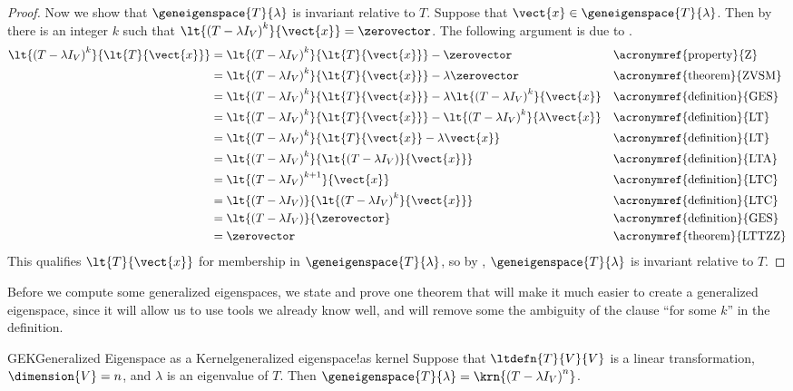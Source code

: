 \begin{proof}
%
Now we show that $\geneigenspace{T}{\lambda}$ is invariant relative to $T$.  Suppose that $\vect{x}\in\geneigenspace{T}{\lambda}$.  Then by  there is an integer $k$ such that $\lt{\left(T-\lambda I_V\right)^k}{\vect{x}}=\zerovector$.  The following argument is due to \zoltantoth.
%
\begin{align*}
\lt{\left(T-\lambda I_V\right)^k}{\lt{T}{\vect{x}}}
%
&=\lt{\left(T-\lambda I_V\right)^k}{\lt{T}{\vect{x}}} - \zerovector
&&\text{\acronymref{property}{Z}}\\
%
&=\lt{\left(T-\lambda I_V\right)^k}{\lt{T}{\vect{x}}} - \lambda\zerovector
&&\text{\acronymref{theorem}{ZVSM}}\\
%
&=\lt{\left(T-\lambda I_V\right)^k}{\lt{T}{\vect{x}}}
- \lambda\lt{\left(T-\lambda I_V\right)^k}{\vect{x}}
&&\text{\acronymref{definition}{GES}}\\
%
&=\lt{\left(T-\lambda I_V\right)^k}{\lt{T}{\vect{x}}}
- \lt{\left(T-\lambda I_V\right)^k}{\lambda\vect{x}}
&&\text{\acronymref{definition}{LT}}\\
%
&=\lt{\left(T-\lambda I_V\right)^k}{\lt{T}{\vect{x}}-\lambda\vect{x}}
&&\text{\acronymref{definition}{LT}}\\
%
&=\lt{\left(T-\lambda I_V\right)^k}{\lt{\left(T-\lambda I_V\right)}{\vect{x}}}
&&\text{\acronymref{definition}{LTA}}\\
%
&=\lt{\left(T-\lambda I_V\right)^{k+1}}{\vect{x}}
&&\text{\acronymref{definition}{LTC}}\\
%
&=\lt{\left(T-\lambda I_V\right)}{\lt{\left(T-\lambda I_V\right)^k}{\vect{x}}}
&&\text{\acronymref{definition}{LTC}}\\
%
&=\lt{\left(T-\lambda I_V\right)}{\zerovector}
&&\text{\acronymref{definition}{GES}}\\
%
&=\zerovector
&&\text{\acronymref{theorem}{LTTZZ}}
\end{align*}
%
This qualifies $\lt{T}{\vect{x}}$ for membership in $\geneigenspace{T}{\lambda}$, so by , $\geneigenspace{T}{\lambda}$ is invariant relative to $T$.
\end{proof}
%
Before we compute some generalized eigenspaces, we state and prove one theorem that will make it much easier to create a generalized eigenspace, since it will allow us to use tools we already know well, and will remove some the ambiguity of the clause ``for some $k$'' in the definition.
%
%
\begin{theorem}{GEK}{Generalized Eigenspace as a Kernel}{generalized eigenspace!as kernel}
Suppose that $\ltdefn{T}{V}{V}$ is a linear transformation, $\dimension{V}=n$, and $\lambda$ is an eigenvalue of $T$.  Then $\geneigenspace{T}{\lambda}=\krn{\left(T-\lambda I_V\right)^n}$.
\end{theorem}
